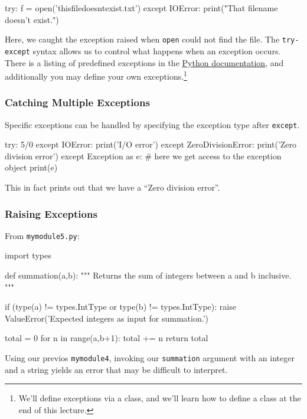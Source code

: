 \documentclass[12pt,letterpaper,twoside]{article}
\begin{document}
\begin{enumerate}
\begin{python}
try:
    f = open('thisfiledoesntexist.txt')
except IOError:
    print("That filename doesn't exist.")
\end{python}

Here, we caught the exception raised when \texttt{open} could not find
the file. The \texttt{try-except} syntax allows us to control what
happens when an exception occurs. There is a listing of predefined
exceptions in the \href{https://docs.python.org/3/library/exceptions.html#Exception}{Python documentation}, 
and additionally you may define your own
exceptions.\footnote{We'll define exceptions via a class, and we'll learn how to define a class at the end of this lecture.}

\subsubsection{Catching Multiple Exceptions}
Specific exceptions can be handled by specifying the exception type
after \texttt{except}.

\begin{python}
try:
    5/0
except IOError:
    print('I/O error')
except ZeroDivisionError:
    print('Zero division error')
except Exception as e:
    # here we get access to the exception object
    print(e)
\end{python}

This in fact prints out that we have a ``Zero division error''.

\subsubsection{Raising Exceptions}
From \texttt{mymodule5.py}:

\begin{python}
import types

def summation(a,b):
    """
    Returns the sum of integers between a and b inclusive.
    """

    if (type(a) != types.IntType or type(b) != types.IntType):
        raise ValueError('Expected integers as input for summation.')

    total = 0
    for n in range(a,b+1):
        total += n
    return total
\end{python}

Using our previos \texttt{mymodule4}, invoking our \texttt{summation} argument with 
an integer and a string yields an error that may be difficult to interpret.


\end{enumerate}
\end{document}
